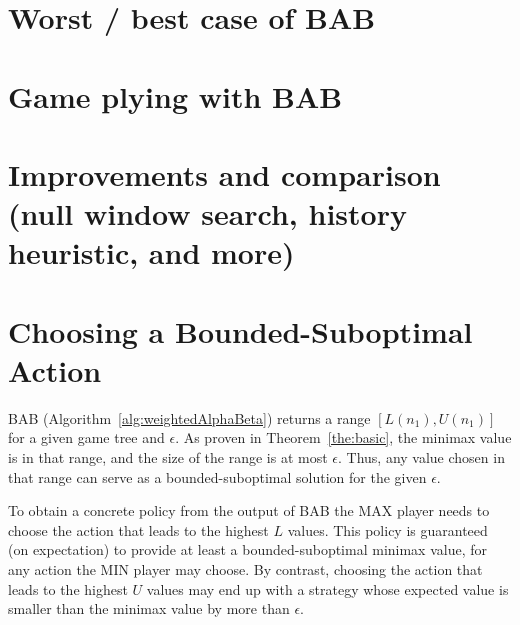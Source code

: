 \documentclass[letterpaper]{article} %
\newcommand{\pess}{\mathit{L}}
\newcommand{\opti}{\mathit{U}}
\newcommand{\rootnode}{\mathit{n_1}}
\begin{document}

\section{Worst / best case of BAB} 




\section{Game plying with BAB} 




\section{Improvements and comparison (null window search, history heuristic, and more)} 




\section{Choosing a Bounded-Suboptimal Action}
\label{sec:action}
BAB (Algorithm~\ref{alg:weightedAlphaBeta}) returns a range $[\pess(\rootnode), \opti(\rootnode)]$ for a given game tree and $\epsilon$. As proven in Theorem~\ref{the:basic}, the minimax value is in that range, and the size of the range is at most $\epsilon$. Thus, any value chosen in that range can serve as a bounded-suboptimal solution for the given $\epsilon$. 

To obtain a concrete policy from the output of BAB the MAX player needs to choose the action that leads to the highest $\pess$ values. This policy is guaranteed (on expectation) to provide at least a bounded-suboptimal minimax value, for any action the MIN player may choose. By contrast, choosing the action that leads to the highest $\opti$ values may end up with a strategy whose expected value is smaller than the minimax value by more than $\epsilon$. %
\end{document}
